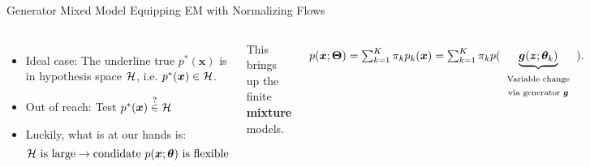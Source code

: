 \begin{frame}{Generator Mixed Model}
  {Equipping EM with Normalizing Flows}
  \begin{columns}
    \centering
    
    
    \centering
    \begin{minipage}{\linewidth}
      
      \begin{itemize}[label=\textbullet]
      \item Ideal case: The underline true $p^{\ast}(\bm{x})$ is in hypothesis space $\mathcal{H}$, i.e. $p^{\ast}(\bm{x}) \in \mathcal{H}$.
      \item Out of reach: Test $p^{\ast}(\bm{x}) \stackrel{?}{\in} \mathcal{H}$
      \item Luckily, what is at our hands is:
        \begin{equation*}
          \mathcal{H} ~\mathrm{is~large}  \rightarrow \mathrm{condidate}~ p(\bm{x};\bm{\theta})~\mathrm{is~flexible}
        \end{equation*}
        
      \end{itemize}
      
      This brings up the finite \textbf{mixture} models.

      \begin{align*}\label{eq:FirstMixtureModel}
        p(\bm{x};\bm{\Theta})  = \textstyle\sum_{k=1}^K \pi_k  p_k(\bm{x}) = \textstyle \sum_{k=1}^K \pi_k  p(\underbrace{\bm{g}(\bm{z};\bm{\theta}_k)}_{\text{\begin{tabular}{c}Variable change \\via generator $\bm{g}$\end{tabular}}}).
      \end{align*}
      

\end{minipage}
\end{columns}
\end{frame}
